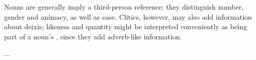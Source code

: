 \ex\label{ex:nounmorphlex}%
\xe

Nouns are generally imply a third-person reference; they distinguish number,
gender and animacy, as well as case. Clitics, however, may also add information
about deixis; likeness and quantity might be interpreted conveniently as
being part of a noun's \Adjc{}, since they add adverb-like information.

...


